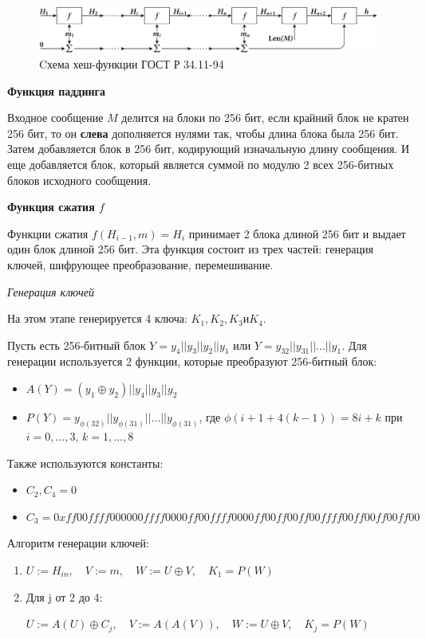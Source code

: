 \documentclass[colorthm]{./civarticle}
\begin{document}
\begin{figure}[H]
    \centering
    \includegraphics[width=0.75\linewidth]{GOST-hash-calculation.svg.png}
    \caption{Cхема хеш-функции ГОСТ Р 34.11-94}
    \label{fig:enter-label}
\end{figure}

\textbf{Функция паддинга}

Входное сообщение $M$ делится на блоки по 256 бит, если крайний блок не кратен 256 бит, то он \textbf{слева} дополняется нулями так, чтобы длина блока была 256 бит. Затем добавляется блок в 256 бит, кодирующий изначальную длину сообщения. И еще добавляется блок, который является суммой по модулю 2 всех 256-битных блоков исходного сообщения.

\textbf{Функция сжатия $f$}

Функции сжатия $f(H_{i-1}, m) = H_i$ принимает 2 блока длиной 256 бит и выдает один блок длиной 256 бит. Эта функция состоит из трех частей: генерация ключей, шифрующее преобразование, перемешивание.

\textit{Генерация ключей}

На этом этапе генерируется 4 ключа: $K_1, K_2, K_3 и K_4$.

Пусть есть 256-битный блок $Y=y_4||y_3||y_2||y_1$ или $Y=y_{32}||y_{31}||...||y_1$. Для генерации используется 2 функции, которые преобразуют 256-битный блок:

\begin{itemize}
    \item $A(Y) = (y_1 \oplus y_2)||y_4||y_3||y_2$
    \item $P(Y) = y_{\phi(32)}||y_{\phi(31)}||...||y_{\phi(31)}$, где $\phi(i+1+4(k-1)) = 8i+k$ при $i=0,...,3$, $k=1,...,8$ 
\end{itemize}

Также используются константы: 

\begin{itemize}
    \item $C_2, C_4 = 0$
    \item $C_3 = 0xff00ffff000000ffff0000ff00ffff0000ff00ff00ff00ffff00ff00ff00ff00$
\end{itemize}

Алгоритм генерации ключей:

\begin{enumerate}
    \item $U := H_{in}, \quad V := m, \quad W := U \oplus V, \quad K_1 = P(W)$
    \item Для j от 2 до 4:

    $U:=A(U) \oplus C_j, \quad V:=A(A(V)), \quad W:=U \oplus V, \quad K_j=P(W)$
\end{enumerate}
\end{document}
